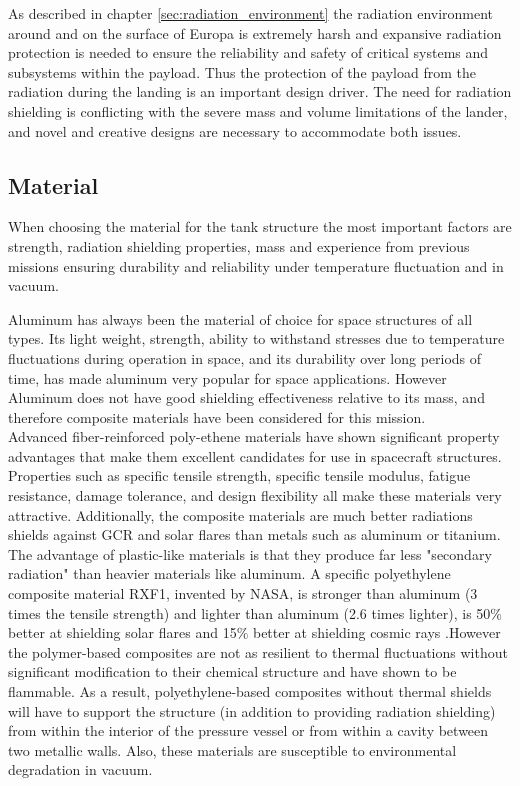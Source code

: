 \label{chap:radedl}

As described in chapter \ref{sec:radiation_environment} the radiation environment around and on the surface of Europa is extremely harsh and expansive radiation protection is needed to ensure the reliability and safety of critical systems and subsystems within the payload. Thus the protection of the payload from the radiation during the landing is an important design driver. The need for radiation shielding is conflicting with the severe mass and volume limitations of the lander, and novel and creative designs are necessary to accommodate both issues.


\subsection{Material}

When choosing the material for the tank structure the most important factors are strength, radiation shielding properties, mass and experience from previous missions ensuring durability and reliability under temperature fluctuation and in vacuum. 

Aluminum has always been the material of choice for space structures of all types. Its light weight, strength, ability to withstand stresses due to temperature fluctuations during operation in space, and its durability over long periods of time, has made aluminum very popular for space applications. However Aluminum does not have good shielding effectiveness relative to its mass, and therefore composite materials have been considered for this mission.\\

Advanced fiber-reinforced poly-ethene materials have shown significant property advantages that make them excellent candidates for use in spacecraft structures. Properties such as specific tensile strength, specific tensile modulus, fatigue resistance, damage tolerance, and design flexibility all make these materials very attractive. Additionally, the composite materials are much better radiations shields against GCR and solar flares than metals such as aluminum or titanium. The advantage of plastic-like materials is that they produce far less "secondary radiation" than heavier materials like aluminum. A specific polyethylene composite material RXF1, invented by NASA, is stronger than aluminum (3 times the tensile strength) and lighter than aluminum (2.6 times lighter), is 50$\%$ better at shielding solar flares and 15$\%$ better at shielding cosmic rays \cite{RXF1}.However the polymer-based composites are not as resilient to thermal fluctuations without significant modification to their chemical structure and have shown to be flammable. As a result, polyethylene-based composites without thermal shields will have to support the structure (in addition to providing radiation shielding) from within the interior of the pressure vessel or from within a cavity between two metallic walls. Also, these materials are susceptible to environmental degradation in vacuum. \\
 

